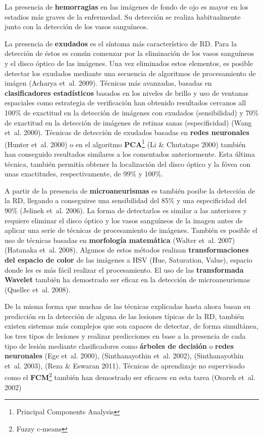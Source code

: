 \documentclass[
  12pt,
  spanish,
  a4paperpaper,
]{report}
\begin{document}
La presencia de \textbf{hemorragias} en las imágenes de fondo de ojo es
mayor en los estadios más graves de la enfermedad. Su detección se
realiza habitualmente junto con la detección de los vasos sanguíneos.

La presencia de \textbf{exudados} es el síntoma más característico de
RD. Para la detección de éstos es común comenzar por la eliminación de
los vasos sanguíneos y el disco óptico de las imágenes. Una vez
eliminados estos elementos, es posible detectar los exudados mediante
una secuencia de algoritmos de procesamiento de imágen (Acharya et~al.
2009). Técnicas más avanzadas, basadas en \textbf{clasificadores
estadísticos} basados en los niveles de brillo y uso de ventanas
espaciales como estrategia de verificación han obtenido resultados
cercanos all 100\% de exactitud en la detección de imágenes con exudados
(sensibilidad) y 70\% de exactitud en la detección de imágenes de
retinas sanas (especificidad) (Wang et~al. 2000). Técnicas de detección
de exudados basadas en \textbf{redes neuronales} (Hunter et~al. 2000) o
en el algoritmo \textbf{PCA}\footnote{Principal Components Analysis} (Li
\& Chutatape 2000) también han conseguido resultados similares a los
comentados anteriormente. Esta última técnica, también permitía obtener
la localización del disco óptico y la fóvea con unas exactitudes,
respectivamente, de 99\% y 100\%.

A partir de la presencia de \textbf{microaneurismas} es también posibe
la detección de la RD, llegando a conseguirse una sensibilidad del 85\%
y una especificidad del 90\% (Jelinek et~al. 2006). La forma de
detectarlos es similar a las anteriores y requiere eliminar el disco
óptico y los vasos sanguíneos de la imagen antes de aplicar una serie de
técnicas de procesamiento de imágenes. También es posible el uso de
técnicas basadas en \textbf{morfología matemática} (Walter et~al. 2007)
(Hatanaka et~al. 2008). Algunos de estos métodos realizan
\textbf{transformaciones del espacio de color} de las imágenes a HSV
(Hue, Saturation, Value), espacio donde les es más fácil realizar el
procesamiento. El uso de las \textbf{transformada Wavelet} también ha
demostrado ser eficaz en la detección de microaneurismas (Quellec et~al.
2008).

De la misma forma que muchas de las técnicas explicadas hasta ahora
basan su predicción en la detección de alguna de las lesiones típicas de
la RD, también existen sistemas más complejos que son capaces de
detectar, de forma simultánea, los tres tipos de lesiones y realizar
predicciones en base a la presencia de cada tipo de lesión mediante
clasificadores como \textbf{árboles de decisión} o \textbf{redes
neuronales} (Ege et~al. 2000), (Sinthanayothin et~al. 2002),
(Sinthanayothin et~al. 2003), (Reza \& Eswaran 2011). Técnicas de
aprendizaje no supervisado como el \textbf{FCM}\footnote{Fuzzy c-means}
también han demostrado ser eficaces en esta tarea (Osareh et~al. 2002)
\end{document}
